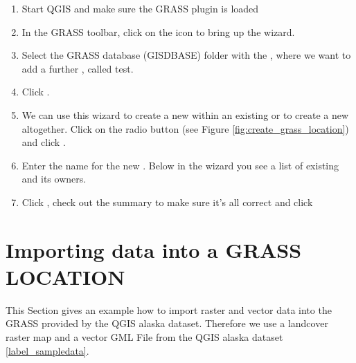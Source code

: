 \begin{enumerate}
  \item Start QGIS and make sure the GRASS plugin is loaded
  \item In the GRASS toolbar, click on the 
   icon to bring up the 
   wizard.
  \item Select the GRASS database (GISDBASE) folder  
  with the , where we want to add a further 
  , called test.
  \item Click . 
  \item We can use this wizard to create a new  within an 
  existing  or to create a new  
  altogether. Click on the radio button  
  (see Figure \ref{fig:create_grass_location}) and click .
  \item Enter the name  for the new . Below 
  in the wizard you see a list of existing  and its owners.
  \item Click , check out the summary to make sure it's all 
  correct and click  
\end{enumerate}

\section{Importing data into a GRASS LOCATION}\label{sec:import_loc_data}

This Section gives an example how to import raster and vector data into the 
 GRASS  provided by the QGIS alaska 
dataset. Therefore we use a landcover raster map  
and a vector GML File  from the QGIS alaska 
dataset \ref{label_sampledata}.

